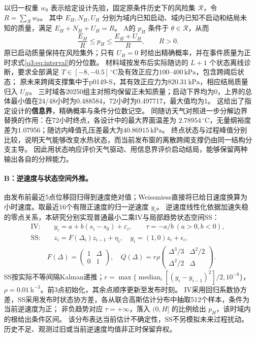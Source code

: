 以归一权重 $w_\theta$ 表示给定设计先验，固定原条件历史下的风险集 $\mathcal R$，令
$R=\sum_{\mathcal R}w_\theta$。
其中 $E_H,N_H,U_H$ 分别为域内已知启动、域内已知不启动和结局未知的质量，满足 $E_H+N_H+U_H=R$。
A的 $p_H$ 条件于 $\theta\in\mathcal R$，从而
\begin{equation}
 \frac{E_H}{R}\le p_H\le\frac{E_H+U_H}{R},\qquad R>0 .\label{q3:eq:bounds}
\end{equation}
原已启动质量保持在风险集外；只有 $U_H=0$ 时给出精确概率，并在事件质量为正时求式\eqref{q3:eq:interval}的分位数。
材料域按发布后实际随访的 $L+1$ 个状态离线诊断，要求全部满足 $T\in[-8,-0.5]\,{}^\circ\mathrm C$及有效正应力$100$--$400\,\mathrm{kPa}$，包含跨阈后状态\cite{q2-mamot2018}；
原未来跨阈支撑集中于p0149-S，其有效正应力为$820.31\,\mathrm{kPa}$，相应结局质量归入 $U_H$。
三时域各\num{20250}组主对照均保留正未知质量；启动下界均为0，上界的总体最小值在24/48小时为0.488584，72小时为0.497717，最大值均为1。
这给出了指定设计的\textbf{信息界}，精确概率与条件分位数记空。
同随访天气对照进一步分解边界替换的作用：在72小时终点，各设计中的最大界面温差为
$2.78954\,{}^\circ\mathrm C$，无量纲裕度差为1.07956；随访内峰值孔压差最大为$40.86915\,\mathrm{kPa}$。
终点状态与过程峰值分别比较，说明天气能够改变水热状态，而当前发布窗的离散跨阈支撑仍由同一结构分支主导。
因此用状态响应评价天气驱动、用信息界评价启动结局，能够保留两种输出各自的分辨能力。

\paragraph{B：逆速度与状态空间外推。}
由发布前最近5点位移回归得到速度绝对值；Weissmiess直接将已给日速度换算为小时速度。取最近16个有限正速度的归一逆速度 $y_i$。
逆速度线性化依据加速失稳的零点关系\cite{q3-fukuzono1985}，本研究分别实现普通最小二乘IV与局部趋势状态空间SS：
\begin{equation}
 \begin{aligned}
 \mathrm{IV}:&\quad y_i=a+b(s_i-s_0)+\varepsilon_i,\qquad\tau=-a/b\ (a>0,b<0),\\
 \mathrm{SS}:&\quad z_i=F(\Delta_i)z_{i-1}+\eta_i,\quad y_i=(1,0)z_i+\epsilon_i,\\[-2pt]
 & F(\Delta)=\begin{pmatrix}1&\Delta\\0&1\end{pmatrix},\quad
 Q(\Delta)=r\rho\begin{pmatrix}\Delta^3/3&\Delta^2/2\\\Delta^2/2&\Delta\end{pmatrix}.
 \end{aligned}\label{q3:eq:deformation}
\end{equation}
SS按实际不等间隔Kalman递推\cite{q3-kalman1960}；$r=\max\{\operatorname{median}_i[(y_i-y_{i-1})^2]/2,10^{-8}\}$，
$\rho=0.01\,\mathrm h^{-3}$。前3点初始化，其余点顺序更新至发布时刻。
IV采用回归系数协方差，SS采用发布时状态协方差，各从联合高斯估计分布中抽取512个样本，条件为当前逆速度为正；
非负趋势对应 $\tau=+\infty$，落入 $(0,H]$ 的比例给出 $p_H$，该时域内的根给出条件区间。
该分布表达当前估计不确定性，SS不另模拟未来过程扰动。历史不足、观测过旧或当前逆速度均值非正时保留弃权。

